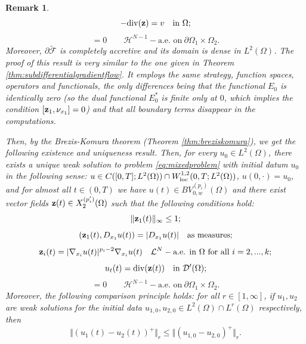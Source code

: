 \documentclass[reqno,12pt]{amsart}
\def\z{{\bf z}}
\newtheorem{remark}[theorem]{Remark}
\numberwithin{equation}{section}
\begin{document}
\begin{remark}
\begin{equation}
\end{equation}
\begin{equation}
-\mathrm{div}(\z) = v \quad \hbox{in} \ \Omega;
\end{equation}
\begin{equation}
[\z_1, \nu_{x_1}] = 0 \qquad  \mathcal{H}^{N-1}-\mbox{a.e.  on} \ \partial \Omega_1 \times \Omega_2.
\end{equation}
Moreover, $\partial \widetilde{\mathcal{F}}$ is completely accretive and its domain is dense in $L^2(\Omega)$. The proof of this result is very similar to the one given in Theorem \ref{thm:subdifferentialgradientflow}. It employs the same strategy, function spaces, operators and functionals, the only differences being that the functional $E_0$ is identically zero (so the dual functional $E_0^*$ is finite only at $0$, which implies the condition $[\z_1, \nu_{x_1}] = 0$) and that all boundary terms disappear in the computations.

Then, by the Brezis-Komura theorem (Theorem \ref{thm:breziskomura}), we get the following existence and uniqueness result. Then, for every $u_0 \in L^2(\Omega)$, there exists a unique weak solution to problem \eqref{eq:mixedproblem} with initial datum $u_0$ in the following sense: $u \in C([0,T]; L^2(\Omega)) \cap W_{\rm loc}^{1,2}(0, T; L^2(\Omega))$, $u(0, \cdot) =u_0$, and for almost all $t \in (0,T)$ we have $u(t) \in BV_{0,w}^{(p_i)}(\Omega)$ and there exist vector fields $\z(t) \in X_2^{(p'_i)}(\Omega)$ such that the following conditions hold:
\begin{equation}
\| \z_1(t) \|_\infty \leq 1;
\end{equation}
\begin{equation}
(\z_1(t), D_{x_1} u(t)) = |D_{x_1} u(t)| \quad \hbox{as measures};
\end{equation}
\begin{equation}
\z_i(t) = |\nabla_{x_i} u(t)|^{p_i - 2} \nabla_{x_i} u(t) \quad \mathcal{L}^N-\hbox{a.e. in } \Omega \hbox{ for all } i = 2,...,k;
\end{equation}
\begin{equation}  
u_t(t) = \mathrm{div}(\z(t))\quad  \hbox{in} \ \mathcal{D}^\prime(\Omega);
\end{equation}
\begin{equation}
[\z_1(t), \nu_{x_1}] = 0 \qquad  \mathcal{H}^{N-1}-\mbox{a.e.  on} \ \partial \Omega_1 \times \Omega_2.
\end{equation}
Moreover, the following comparison principle holds: for all $r \in [1,\infty]$, if $u_1, u_2$ are weak solutions for the initial data $u_{1,0}, u_{2,0} \in L^2(\Omega) \cap L^r(\Omega)$ respectively, then
\begin{equation}
\Vert (u_1(t) - u_2(t))^+ \Vert_r \leq \Vert ( u_{1,0}- u_{2,0})^+ \Vert_r.
\end{equation}
\end{remark}
\end{document}
